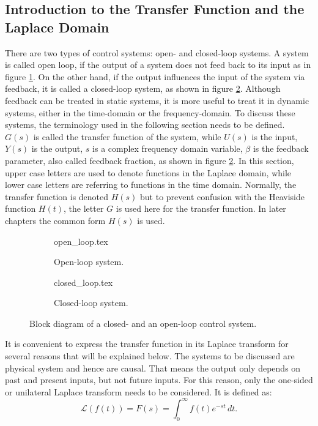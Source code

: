 \subsection{Introduction to the Transfer Function and the Laplace Domain}%
\label{sec:transfer_function}
There are two types of control systems: open- and closed-loop systems. A system is called open loop, if the output of a system does not feed back to its input as in figure \ref{fig:open_loop}. On the other hand, if the output influences the input of the system via feedback, it is called a closed-loop system, as shown in figure \ref{fig:closed_loop}. Although feedback can be treated in static systems, it is more useful to treat it in dynamic systems, either in the time-domain or the frequency-domain. To discuss these systems, the terminology used in the following section needs to be defined. $G(s)$ is called the transfer function of the system, while $U(s)$ is the input, $Y(s)$ is the output, $s$ is a complex frequency domain variable, $\beta$ is the feedback parameter, also called feedback fraction, as shown in figure \ref{fig:closed_loop}. In this section, upper case letters are used to denote functions in the Laplace domain, while lower case letters are referring to functions in the time domain. Normally, the transfer function is denoted $H(s)$ but to prevent confusion with the Heaviside function $H(t)$, the letter $G$ is used here for the transfer function. In later chapters the common form $H(s)$ is used.
\begin{figure}[ht]
    \centering
    \begin{subfigure}{0.4\linewidth}
        \centering
        {open_loop.tex}
        \caption{Open-loop system.}
        \label{fig:open_loop}
    \end{subfigure}
    \begin{subfigure}{0.4\linewidth}
        \centering
        {closed_loop.tex}
        \caption{Closed-loop system.}
        \label{fig:closed_loop}
    \end{subfigure}
    \caption{Block diagram of a closed- and an open-loop control system.}
    \label{fig:feedback_systems}
\end{figure}

It is convenient to express the transfer function in its Laplace transform for several reasons that will be explained below. The systems to be discussed are physical system and hence are causal. That means the output only depends on past and present inputs, but not future inputs. For this reason, only the one-sided or unilateral Laplace transform needs to be considered. It is defined as:
\begin{equation}
    \mathscr{L}\left( f(t) \right) = F(s) = \int_0^\infty f(t) e^{-st}\,dt.
\end{equation}

